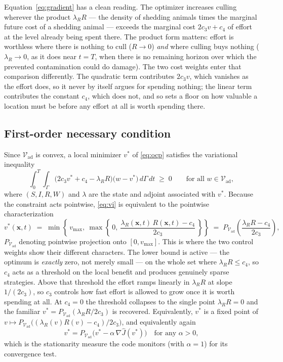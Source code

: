 \documentclass[11pt]{article}
\newcommand{\Vad}{\mathcal{V}_{\mathrm{ad}}}
\begin{document}
Equation~\eqref{eq:gradient} has a clean reading. The optimizer increases culling wherever the product $\lambda_R R$ --- the density of shedding animals times the marginal future cost of a shedding animal --- exceeds the marginal cost $2c_3 v + c_4$ of effort at the level already being spent there. The product form matters: effort is worthless where there is nothing to cull ($R \to 0$) \emph{and} where culling buys nothing ($\lambda_R \to 0$, as it does near $t=T$, when there is no remaining horizon over which the prevented contamination could do damage). The two cost weights enter that comparison differently. The quadratic term contributes $2c_3v$, which vanishes as the effort does, so it never by itself argues for spending nothing; the linear term contributes the constant $c_4$, which does not, and so sets a floor on how valuable a location must be before any effort at all is worth spending there.

\subsection{First-order necessary condition}

Since $\Vad$ is convex, a local minimizer $v^*$ of \eqref{eq:ocp} satisfies the variational inequality
\begin{equation}
\int_0^T\!\!\int_\Gamma \Big(2c_3 v^* + c_4 - \lambda_R R\Big)\big(w - v^*\big)\,d\Gamma\,dt \;\ge\; 0
\qquad \text{for all } w\in\Vad,
\label{eq:vi}
\end{equation}
where $(S,I,R,W)$ and $\lambda$ are the state and adjoint associated with $v^*$. Because the constraint acts pointwise, \eqref{eq:vi} is equivalent to the pointwise characterization
\begin{equation}
v^*(\mathbf{x},t) \;=\; \min\left\{\,v_{\max},\ \max\left\{\,0,\ \frac{\lambda_R(\mathbf{x},t)\,R(\mathbf{x},t) - c_4}{2c_3}\,\right\}\right\}
\;=\; P_{\Vad}\!\left(\frac{\lambda_R R - c_4}{2c_3}\right),
\label{eq:pointwise-optimality}
\end{equation}
$P_{\Vad}$ denoting pointwise projection onto $[0,v_{\max}]$. This is where the two control weights show their different characters. The lower bound is active --- the optimum is \emph{exactly} zero, not merely small --- on the whole set where $\lambda_R R \le c_4$, so $c_4$ acts as a threshold on the local benefit and produces genuinely sparse strategies. Above that threshold the effort ramps linearly in $\lambda_R R$ at slope $1/(2c_3)$, so $c_3$ controls how fast effort is allowed to grow once it is worth spending at all. At $c_4=0$ the threshold collapses to the single point $\lambda_R R = 0$ and the familiar $v^* = P_{\Vad}(\lambda_R R/2c_3)$ is recovered. Equivalently, $v^*$ is a fixed point of $v\mapsto P_{\Vad}\big((\lambda_R(v)R(v)-c_4)/2c_3\big)$, and equivalently again
\begin{equation}
v^* = P_{\Vad}\big(v^* - \alpha\,\nabla\hat J(v^*)\big) \quad\text{for any } \alpha>0,
\label{eq:stationarity}
\end{equation}
which is the stationarity measure the code monitors (with $\alpha=1$) for its convergence test.
\end{document}
